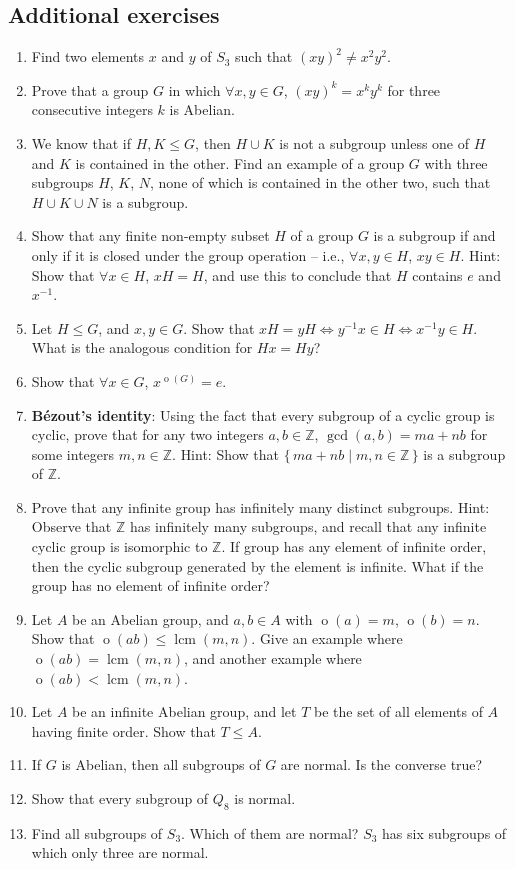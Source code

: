 \documentclass[svgnames]{article}
\theoremstyle{definition}
\theoremstyle{remark}
\DeclareMathOperator{\ord}{o}
\DeclareMathOperator{\lcm}{lcm}
\begin{document}
\begin{appendices}
\section{Additional exercises}\label{sec:Exercises}
\begin{enumerate}
\item Find two elements $x$ and $y$ of $S_3$ such that $(xy)^2 \ne x^2 y^2$.
\item Prove that a group $G$ in which $\forall x,y \in G$, $(xy)^k = x^k y^k$ for three consecutive integers $k$ is Abelian.
\item We know that if $H, K \le G$, then $H \cup K$ is not a subgroup unless one of $H$ and $K$ is contained in the other. Find an example of a group $G$ with three subgroups $H$, $K$, $N$, none of which is contained in the other two, such that $H \cup K \cup N$ is a subgroup.
\item Show that any finite non-empty subset $H$ of a group $G$ is a subgroup if and only if it is closed under the group operation -- i.e., $\forall x, y \in H$, $xy \in H$. {\tiny Hint: Show that $\forall x \in H$, $xH = H$, and use this to conclude that $H$ contains $e$ and $x^{-1}$.}
\item Let $H \le G$, and $x, y \in G$. Show that $xH = yH \iff y^{-1}x \in H \iff x^{-1}y \in H$. What is the analogous condition for $Hx = Hy$?
\item Show that $\forall x \in G$, $x^{\ord(G)} = e$.
\item \textbf{B\'ezout's identity}: Using the fact that every subgroup of a cyclic group is cyclic, prove that for any two integers $a, b \in \mathbb Z$, $\gcd(a,b) = ma + nb$ for some integers $m, n \in \mathbb Z$. {\tiny Hint: Show that $\{\, ma + nb \mid m, n \in \mathbb Z \,\}$ is a subgroup of $\mathbb Z$.}
\item Prove that any infinite group has infinitely many distinct subgroups. {\tiny Hint: Observe that $\mathbb Z$ has infinitely many subgroups, and recall that any infinite cyclic group is isomorphic to $\mathbb Z$. If group has any element of infinite order, then the cyclic subgroup generated by the element is infinite. What if the group has no element of infinite order?}
\item Let $A$ be an Abelian group, and $a, b \in A$ with $\ord(a) = m$, $\ord(b) = n$. Show that $\ord(ab) \le \lcm(m, n)$. Give an example where $\ord(ab) = \lcm(m,n)$, and another example where $\ord(ab) < \lcm(m,n)$.
\item Let $A$ be an infinite Abelian group, and let $T$ be the set of all elements of $A$ having finite order. Show that $T \le A$.
\item If $G$ is Abelian, then all subgroups of $G$ are normal. Is the converse true?
\item Show that every subgroup of $Q_8$ is normal.
\item Find all subgroups of $S_3$. Which of them are normal? {\tiny $S_3$ has six subgroups of which only three are normal.}
\end{enumerate}
\end{appendices}
\end{document}
